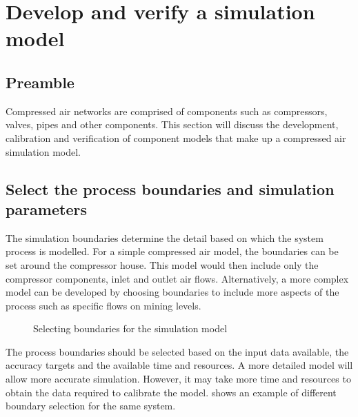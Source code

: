 \section{Develop and verify a simulation model}
	\subsection{Preamble}
	Compressed air networks are comprised of components such as compressors, valves, pipes and other components. This section will discuss the development, calibration and verification of component models that make up a compressed air simulation model. 
	
	\subsection{Select the process boundaries and simulation parameters}
	The simulation boundaries determine the detail based on which the system process is modelled. For a simple compressed air model, the boundaries can be set around the compressor house. This model would then include only the compressor components, inlet and outlet air flows. Alternatively, a more complex model can be developed by choosing boundaries to include more aspects of the process such as specific flows on mining levels.\par 
	 \begin{figure}[h]
	 	\centering
	 	\caption{Selecting boundaries for the simulation model}
	 	\label{fig: Sensitivity}
	 \end{figure}
	The process boundaries should be selected based on the input data available, the accuracy targets and the available time and resources. A more detailed model will allow more accurate simulation. However, it may take more time and resources to obtain the data required to calibrate the model.  shows an example of different boundary selection for the same system.

